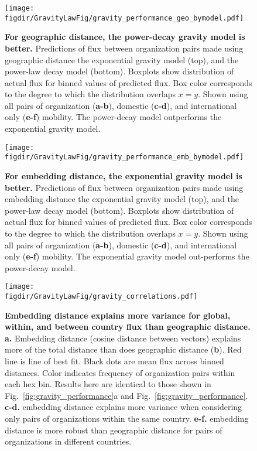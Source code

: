 \documentclass[12pt]{article} %
\def\figdir{../Figs}
\begin{document}
%
%
\begin{figure}[p!]
	\centering
	\texttt{[image: \\figdir/GravityLawFig/gravity\_performance\_geo\_bymodel.pdf]}
	\caption{
		\textbf{For geographic distance, the power-decay gravity model is better.}
		Predictions of flux between organization pairs made using geographic distance the exponential gravity model (top), and the power-law decay model (bottom).
		Boxplots show distribution of actual flux for binned values of predicted flux.
		Box color corresponds to the degree to which the distribution overlaps $x = y$.
		Shown using all pairs of organization (\textbf{a-b}), domestic (\textbf{c-d}), and international only (\textbf{e-f}) mobility.
		The power-decay model outperforms the exponential gravity model.
	}
	\label{fig:supp:predict_geo_bymodel}
\end{figure}



%
%
\begin{figure}[p!]
	\centering
	\texttt{[image: \\figdir/GravityLawFig/gravity\_performance\_emb\_bymodel.pdf]}
	\caption{
		\textbf{For embedding distance, the exponential gravity model is better.}
		Predictions of flux between organization pairs made using embedding distance the exponential gravity model (top), and the power-law decay model (bottom).
		Boxplots show distribution of actual flux for binned values of predicted flux.
		Box color corresponds to the degree to which the distribution overlaps $x = y$.
		Shown using all pairs of organization (\textbf{a-b}), domestic (\textbf{c-d}), and international only (\textbf{e-f}) mobility.
		The exponential gravity model out-performs the power-decay model.
	}
	\label{fig:supp:predict_emb_bymodel}
\end{figure}



%
%
\begin{figure}[p!]
	\centering
	\texttt{[image: \\figdir/GravityLawFig/gravity\_correlations.pdf]}
	\caption{
		\textbf{Embedding distance explains more variance for global, within, and between country flux than geographic distance.}
		\textbf{a.}
		Embedding distance (cosine distance between vectors) explains more of the total distance than does geographic distance (\textbf{b}).
		Red line is line of best fit.
		Black dots are mean flux across binned distances.
		Color indicates frequency of organization pairs within each hex bin.
		Results here are identical to those shown in Fig.~\ref{fig:gravity_performance}a and Fig.~\ref{fig:gravity_performance}.
		\textbf{c-d.}	embedding distance explains more variance when considering only pairs of organizations within the same country.
		\textbf{e-f.} embedding distance is more robust than geographic distance for pairs of organizations in different countries.
	}
	\label{fig:supp:gravity_correlation}
\end{figure}
\end{document}
